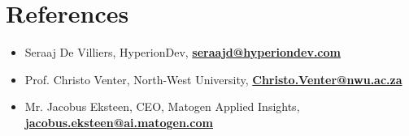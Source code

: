 \documentclass[a4paper,10pt]{article}
\begin{document}
\section*{References}
\begin{itemize}
	\item Seraaj De Villiers, HyperionDev, \href{mailto:seraajd@hyperiondev.com}{\textbf{seraajd@hyperiondev.com}}
	\item Prof. Christo Venter, North-West University, \href{mailto:christo.venter@nwu.ac.za}{\textbf{Christo.Venter@nwu.ac.za}}
	\item Mr. Jacobus Eksteen, CEO, Matogen Applied Insights, \href{mailto:jacobus.eksteen@ai.matogen.com}{\textbf{jacobus.eksteen@ai.matogen.com}}
\end{itemize}
	
\end{document}
